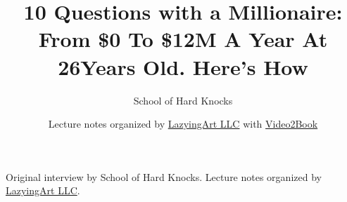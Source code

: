 \documentclass[11pt,oneside]{book}
\begin{document}
\frontmatter
\title{10 Questions with a Millionaire: From \$0 To \$12M A Year At 26Years Old. Here's How}
\author{School of Hard Knocks}
\date{Lecture notes organized by \href{https://lazying.art}{LazyingArt LLC} with \href{https://github.com/lachlanchen/Video2Book}{Video2Book}}
\maketitle
\begin{center}
\small Original interview by School of Hard Knocks. Lecture notes organized by \href{https://lazying.art}{LazyingArt LLC}.
\end{center}
\clearpage
\mainmatter

\end{document}
